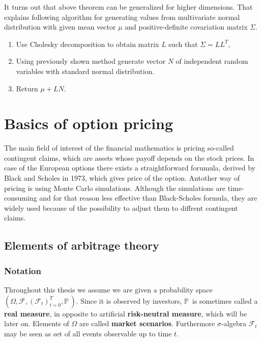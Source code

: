 \documentclass[a4paper,12pt, oneside]{book}
\theoremstyle{definition}
\theoremstyle{remark}
\def\P{{\mathbb{P}}\,}
\begin{document}
It turns out that above theorem can be generalized for higher dimensions. That explains following algorithm for generating values from multivariate normal distribution with given mean vector $\mu$ and positive-definite covariation matrix $\Sigma$. 
\begin{enumerate}
 \item Use Cholesky decomposition to obtain matrix $L$ such that $\Sigma = LL^T$,
 \item Using previously shown method generate vector $N$ of independent random variables with standard normal distribution.
 \item Return $\mu + LN$.
\end{enumerate}




\chapter{Basics of option pricing}
The main field of interest of the financial mathematics is pricing so-called contingent claims, which are assets whose payoff depends on the stock prices. In case of the European options there exists a straightforward forumula, derived by Black and Scholes in 1973, which gives price of the option. Antother way of pricing is using Monte Carlo simulations. Although the simulations are time-consuming and for that reason less effective than Black-Scholes formula, they are widely used because of the possibility to adjust them to diffrent contingent claims. 

\section{Elements of arbitrage theory}

\subsection{Notation}
Throughout this thesis we assume we are given a probability space $(\Omega, \mathcal{F}, (\mathcal{F}_t)_{t=0}^T, \P)$. Since it is observed by investors, $\P$ is sometimes called a \textbf{real measure}, in opposite to artificial \textbf{risk-neutral measure}, which will be later on. Elements of $\Omega$ are called \textbf{market scenarios}. Furthermore $\sigma$-algebra $\mathcal{F}_t$ may be seen as set of all events observable up to time $t$.
\end{document}
